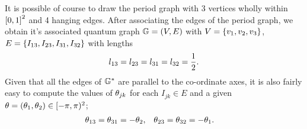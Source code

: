 It is possible of course to draw the period graph with 3 vertices wholly within $\left[ 0,1 \right]^2$ and 4 hanging edges.
After associating the edges of the period graph, we obtain it's associated quantum graph $\mathbb{G}=\left( V,E \right)$ with $V=\left\{ v_1,v_2,v_3 \right\}$, $E=\left\{ I_{13},I_{23},I_{31},I_{32} \right\}$ with lengths
\begin{align*}
	l_{13} = l_{23} = l_{31} = l_{32} = \frac{1}{2}.
\end{align*}
Given that all the edges of $\mathbb{G}^*$ are parallel to the co-ordinate axes, it is also fairly easy to compute the values of $\theta_{jk}$ for each $I_{jk}\in E$ and a given $\theta=\left( \theta_1,\theta_2 \right)\in[-\pi,\pi)^2$;
\begin{align*}
	\theta_{13} = \theta_{31} = -\theta_2, &\quad \theta_{23} = \theta_{32} = -\theta_1.
\end{align*}

